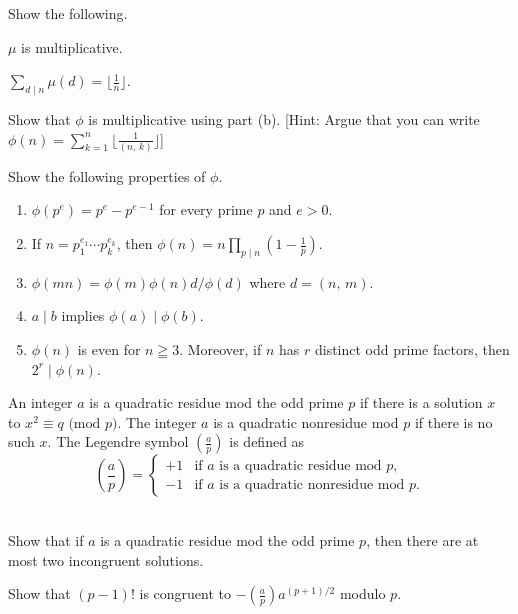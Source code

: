 \documentclass[a4paper,11pt]{article}
\theoremstyle{mythm}
\theoremstyle{mydef}
\renewcommand{\pmod}[1]{\text{ (mod $#1$)}}
\begin{document}
 Show the following.
\begin{enumerate*}[{\bf (a)}]
\item $\mu$ is multiplicative.
\item $\sum_{d \mid n}\mu(d)=\lfloor \frac{1}{n} \rfloor$.
\item Show that $\phi$ is multiplicative using part (b). [Hint: Argue that you
  can write $\phi(n)=\sum_{k = 1}^n\lfloor \frac{1}{(n,\,k)} \rfloor$] \\
\end{enumerate*}

 Show the following properties of $\phi$.
\begin{enumerate}[{\bf (a)}]
\item $\phi(p^e)=p^e-p^{e-1}$ for every prime $p$ and $e>0$.
\item If $n=p_1^{e_1} \cdots p_k^{e_k}$, then $\phi(n)=n\prod_{p \mid
    n}(1-\frac{1}{p})$.
\item $\phi(mn)=\phi(m)\phi(n)d/\phi(d)$ where $d=(n,\,m)$.
\item $a \mid b$ implies $\phi(a) \mid \phi(b)$.
\item $\phi(n)$ is even for $n \geqq 3$. Moreover, if $n$ has $r$ distinct odd
  prime factors, then $2^r \mid \phi(n)$. \\
\end{enumerate}

An integer $a$ is a quadratic residue mod the odd prime $p$ if there is a
solution $x$ to $x^2 \equiv q \pmod{p}$. The integer $a$ is a quadratic
nonresidue mod $p$ if there is no such $x$. The Legendre symbol $(\frac{a}{p})$
is defined as
\[
  \left( \frac{a}{p} \right) =
  \begin{cases}
    +1 & \text{if $a$ is a quadratic residue mod $p$,} \\
    -1 & \text{if $a$ is a quadratic nonresidue mod $p$.}
  \end{cases}
\] \\

\begin{enumerate*}[{\bf (a)}]
\item Show that if $a$ is a quadratic residue mod the odd prime $p$, then there
  are at most two incongruent solutions.
\item Show that $(p-1)!$ is congruent to $-\left( \frac{a}{p}
  \right)a^{(p+1)/2}$ modulo $p$.
\end{enumerate*}
\end{document}
